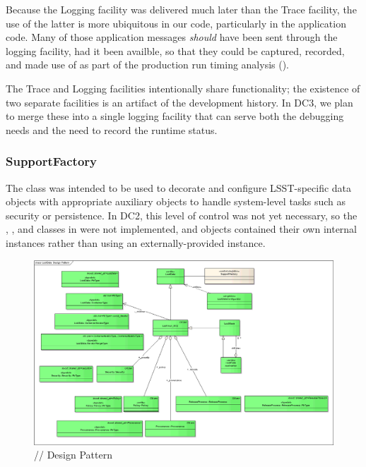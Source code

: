Because the Logging facility was delivered much later than the
Trace facility, the use of the latter is more ubiquitous in our
code, particularly in the application code.  Many of those application
messages \textit{should} have been sent through the logging facility, had
it been availble, so that they could be captured, recorded, and made
use of as part of the production run timing analysis
().   

The Trace and Logging facilities intentionally share
functionality; the existence of two separate facilities is an artifact
of the development history.  In DC3, we plan to merge these into a
single logging facility that can serve both the debugging needs and
the need to record the runtime status.  



\subsubsection{SupportFactory}

The  class was intended to be used to decorate and
configure LSST-specific data objects with appropriate auxiliary objects
to handle system-level tasks such as security or persistence.  In DC2,
this level of control was not yet necessary, so the ,
, and  classes in 
were not implemented, and objects contained their own internal 
instances rather than using an externally-provided instance.

\begin{figure}[htbp]
\includegraphics[width=\textwidth]{figures/LsstDataDesign.png}
\caption{// Design Pattern}
\label{lsstdata-design}
\end{figure}

